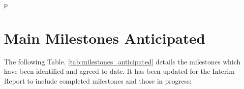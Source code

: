 \documentclass[runningheads,a4paper]{llncs}
\begin{document}
%
%



%
%
p
\newpage
\section*{Main Milestones Anticipated}

The following Table. \ref{tab:milestones_anticipated} details the milestones which have been identified and agreed to date. It has been updated for the Interim Report to include completed milestones and those in progress:
\end{document}
